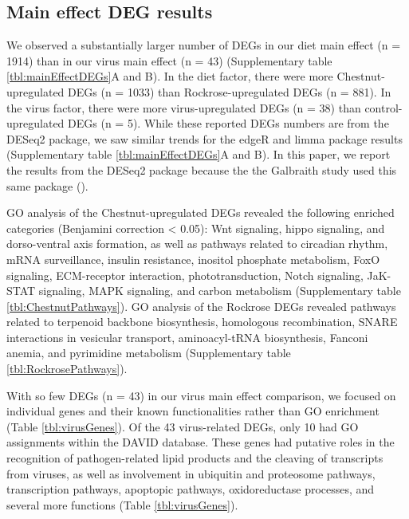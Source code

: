 \documentclass[11pt,a4paper,oldfontcommands,openany]{memoir}
\numberwithin{equation}{section} %
\begin{document}
\subsection{Main effect DEG results}

We observed a substantially larger number of DEGs in our diet main effect (n = 1914) than in our virus main effect (n = 43) (Supplementary table \ref{tbl:mainEffectDEGs}A and B). In the diet factor, there were more Chestnut-upregulated DEGs (n = 1033) than Rockrose-upregulated DEGs (n = 881). In the virus factor, there were more virus-upregulated DEGs (n = 38) than control-upregulated DEGs (n = 5). While these reported DEGs numbers are from the DESeq2 package, we saw similar trends for the edgeR and limma package results (Supplementary table \ref{tbl:mainEffectDEGs}A and B). In this paper, we report the  results from the DESeq2 package because the the Galbraith study used this same package (\citealt{galbraith}).

GO analysis of the Chestnut-upregulated DEGs revealed the following enriched categories (Benjamini correction < 0.05): Wnt signaling, hippo signaling, and dorso-ventral axis formation, as well as pathways related to circadian rhythm, mRNA surveillance, insulin resistance, inositol phosphate metabolism, FoxO signaling, ECM-receptor interaction, phototransduction, Notch signaling, JaK-STAT signaling, MAPK signaling, and carbon metabolism (Supplementary table \ref{tbl:ChestnutPathways}). GO analysis of the Rockrose DEGs revealed pathways related to terpenoid backbone biosynthesis, homologous recombination, SNARE interactions in vesicular transport, aminoacyl-tRNA biosynthesis, Fanconi anemia, and pyrimidine metabolism (Supplementary table \ref{tbl:RockrosePathways}).

With so few DEGs (n = 43) in our virus main effect comparison, we focused on individual genes and their known functionalities rather than GO enrichment (Table \ref{tbl:virusGenes}). Of the 43 virus-related DEGs, only 10 had GO assignments within the DAVID database. These genes had putative roles in the recognition of pathogen-related lipid products and the cleaving of transcripts from viruses, as well as involvement in ubiquitin and proteosome pathways, transcription pathways, apoptopic pathways, oxidoreductase processes, and several more functions (Table \ref{tbl:virusGenes}).
\end{document}
